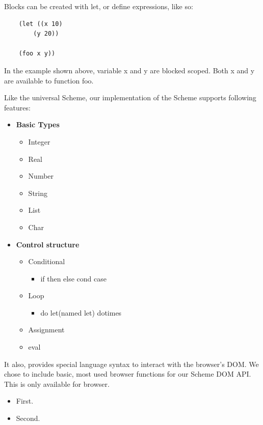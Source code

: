 Blocks can be created with let, or define expressions, like so:


\begin{lstlisting}
	(let ((x 10)
		(y 20))
	
	(foo x y))
\end{lstlisting}


In the example shown above, variable x and y are blocked scoped. Both x and y are available to function foo.

Like the universal Scheme, our implementation of the Scheme supports following features:
\begin{itemize}
	\item {\textbf{Basic Types}}
	\begin{itemize}
		\item Integer
		\item Real
		\item Number
		\item String
		\item List
		\item Char
	\end{itemize}
\end{itemize}

\begin{itemize}
	\item{\textbf{Control structure}}
	\begin{itemize}
		\item Conditional
		\begin{itemize}
			\item if then else cond case
		\end{itemize}
		\item Loop
		\begin{itemize}
			\item do let(named let) dotimes
		\end{itemize}
		\item Assignment
		\item eval
	\end{itemize}
\end{itemize}

It also, provides special language syntax to interact with the browser's DOM. We chose to include basic, most used browser functions for our Scheme DOM API. This is only available for browser. 

\begin{itemize}[label={}]
	\item First.
	\item Second.
\end{itemize}

